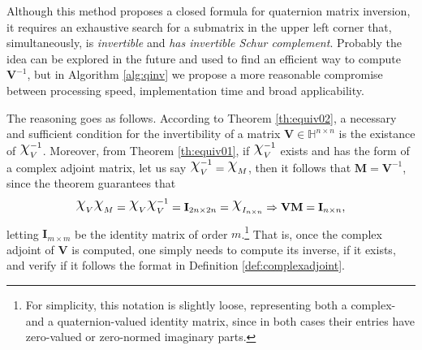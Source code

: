 Although this method proposes a closed formula for quaternion matrix inversion, it requires an exhaustive search for a submatrix in the upper left corner that, simultaneously, is \textit{invertible} and \textit{has invertible Schur complement}. Probably the idea can be explored in the future and used to find an efficient way to compute $\mathbf{V}^{-1}$, but in Algorithm \ref{alg:qinv} we propose a more reasonable compromise between processing speed, implementation time and broad applicability.

The reasoning goes as follows. According to Theorem \ref{th:equiv02}, a necessary and sufficient condition for the invertibility of a matrix $\mathbf{V} \in \mathbb{H}^{n \times n}$ is the existance of $\rchi^{-1}_{V}$. Moreover, from Theorem \ref{th:equiv01}, if $\rchi^{-1}_{V}$ exists and has the form of a complex adjoint matrix, let us say $\rchi_{V}^{-1} = \rchi_{M}$, then it follows that $\mathbf{M} = \mathbf{V}^{-1}$, since the theorem guarantees that
\begin{equation}
    \rchi_{V} \rchi_{M} = \rchi_{V} \rchi_{V}^{-1} = \mathbf{I}_{2n \times 2n} = \rchi_{I_{n \times n}}
    \Rightarrow \mathbf{V} \mathbf{M} = \mathbf{I}_{n \times n},
\end{equation}
letting $\mathbf{I}_{m \times m}$ be the identity matrix of order $m$.\footnote{For simplicity, this notation is slightly loose, representing both a complex- and a quaternion-valued identity matrix, since in both cases their entries have zero-valued or zero-normed imaginary parts.} That is, once the complex adjoint of $\mathbf{V}$ is computed, one simply needs to compute its inverse, if it exists, and verify if it follows the format in Definition \ref{def:complexadjoint}.

